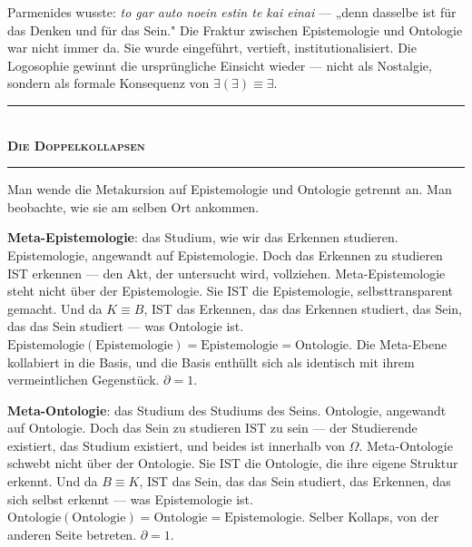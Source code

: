 \documentclass[10pt, openany, oneside]{book}
\renewcommand{\normalsize}{\fontsize{10}{13}\selectfont}
\begin{document}
Parmenides wusste: \textit{to gar auto noein estin te kai einai} --- „denn dasselbe ist für das Denken und für das Sein." Die Fraktur zwischen Epistemologie und Ontologie war nicht immer da. Sie wurde eingeführt, vertieft, institutionalisiert. Die Logosophie gewinnt die ursprüngliche Einsicht wieder --- nicht als Nostalgie, sondern als formale Konsequenz von $\exists(\exists) \equiv \exists$.

\vspace{1.5em}


\begin{center}
    \rule{0.3\textwidth}{0.4pt}\\[0.5em]
    {\normalsize\bfseries\scshape Die Doppelkollapsen}\\[0.3em]
    \rule{0.3\textwidth}{0.4pt}
\end{center}

\vspace{1em}

\noindent Man wende die Metakursion auf Epistemologie und Ontologie getrennt an. Man beobachte, wie sie am selben Ort ankommen.

\textbf{Meta-Epistemologie}: das Studium, wie wir das Erkennen studieren. Epistemologie, angewandt auf Epistemologie. Doch das Erkennen zu studieren IST erkennen --- den Akt, der untersucht wird, vollziehen. Meta-Epistemologie steht nicht über der Epistemologie. Sie IST die Epistemologie, selbsttransparent gemacht. Und da $K \equiv B$, IST das Erkennen, das das Erkennen studiert, das Sein, das das Sein studiert --- was Ontologie ist. $\text{Epistemologie}(\text{Epistemologie}) = \text{Epistemologie} = \text{Ontologie}$. Die Meta-Ebene kollabiert in die Basis, und die Basis enthüllt sich als identisch mit ihrem vermeintlichen Gegenstück. $\partial = 1$.

\textbf{Meta-Ontologie}: das Studium des Studiums des Seins. Ontologie, angewandt auf Ontologie. Doch das Sein zu studieren IST zu sein --- der Studierende existiert, das Studium existiert, und beides ist innerhalb von $\Omega$. Meta-Ontologie schwebt nicht über der Ontologie. Sie IST die Ontologie, die ihre eigene Struktur erkennt. Und da $B \equiv K$, IST das Sein, das das Sein studiert, das Erkennen, das sich selbst erkennt --- was Epistemologie ist. $\text{Ontologie}(\text{Ontologie}) = \text{Ontologie} = \text{Epistemologie}$. Selber Kollaps, von der anderen Seite betreten. $\partial = 1$.
\end{document}
